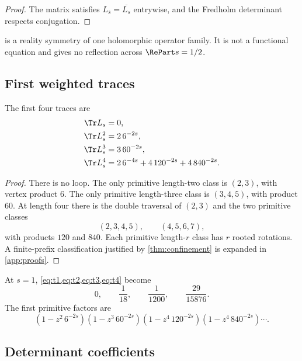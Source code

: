 \begin{proof}
The matrix satisfies \(L_{\overline s}=\overline{L_s}\) entrywise, and the
Fredholm determinant respects conjugation.
\end{proof}

\begin{remark}
 is a reality symmetry of one holomorphic operator
family.  It is not a functional equation and gives no reflection across
\(\RePart s=1/2\).
\end{remark}

\subsection{First weighted traces}

\begin{proposition}
\label{prop:first-traces}
The first four traces are
\begin{align}
\Tr L_s&=0,                                                   \label{eq:t1}\\
\Tr L_s^2&=2\,6^{-2s},                                       \label{eq:t2}\\
\Tr L_s^3&=3\,60^{-2s},                                      \label{eq:t3}\\
\Tr L_s^4&=2\,6^{-4s}+4\,120^{-2s}+4\,840^{-2s}.              \label{eq:t4}
\end{align}
\end{proposition}

\begin{proof}
There is no loop.  The only primitive length-two class is
\((2,3)\), with vertex product \(6\).  The only primitive length-three class
is \((3,4,5)\), with product \(60\).  At length four there is the double
traversal of \((2,3)\) and the two primitive classes
\[
 (2,3,4,5),
 \qquad
 (4,5,6,7),
\]
with products \(120\) and \(840\).  Each primitive length-\(r\) class has
\(r\) rooted rotations.  A finite-prefix classification justified by
\cref{thm:confinement} is expanded in \cref{app:proofs}.
\end{proof}

At \(s=1\), \cref{eq:t1,eq:t2,eq:t3,eq:t4} become
\[
 0,\qquad\frac1{18},\qquad\frac1{1200},\qquad\frac{29}{15876}.
\]
The first primitive factors are
\[
 (1-z^2\,6^{-2s})
 (1-z^3\,60^{-2s})
 (1-z^4\,120^{-2s})
 (1-z^4\,840^{-2s})\cdots.
\]

\subsection{Determinant coefficients}

